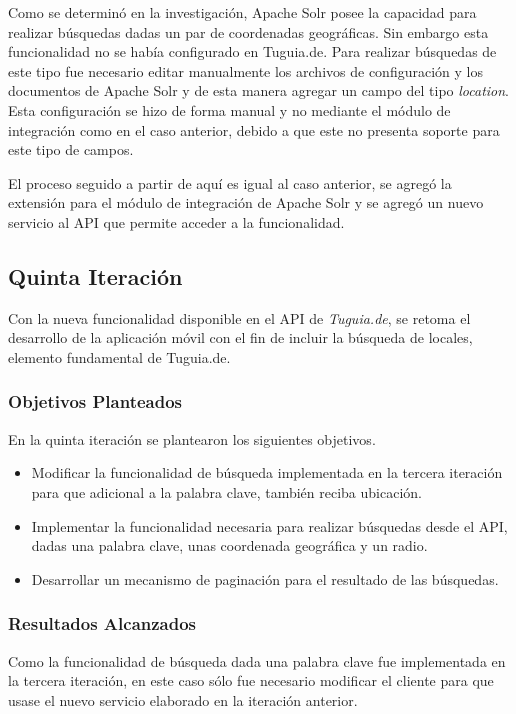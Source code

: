 Como se determinó en la investigación, Apache Solr posee la capacidad para realizar búsquedas dadas un par de coordenadas geográficas. Sin embargo esta funcionalidad no se había configurado en Tuguia.de. Para realizar búsquedas de este tipo fue necesario editar manualmente los archivos de configuración y los documentos de Apache Solr y de esta manera agregar un campo del tipo \textit{location}. Esta configuración se hizo de forma manual y no mediante el módulo de integración como en el caso anterior, debido a que este no presenta soporte para este tipo de campos. 

El proceso seguido a partir de aquí es igual al caso anterior, se agregó la extensión para el módulo de integración de Apache Solr y se agregó un nuevo servicio al API que permite acceder a la funcionalidad.

\subsection{Quinta Iteración}

Con la nueva funcionalidad disponible en el API de \textit{Tuguia.de}, se retoma el desarrollo de la aplicación móvil con el fin de incluir la búsqueda de locales, elemento fundamental de Tuguia.de.
 
\subsubsection{Objetivos Planteados} 
En la quinta iteración se plantearon los siguientes objetivos.
\begin{itemize}

\item Modificar la funcionalidad de búsqueda implementada en la tercera iteración para que adicional a la palabra clave, también reciba ubicación.
\item Implementar la funcionalidad necesaria para realizar búsquedas desde el API, dadas una palabra clave, unas coordenada geográfica y un radio.
\item Desarrollar un mecanismo de paginación para el resultado de las búsquedas.
\end{itemize}

\subsubsection{Resultados Alcanzados}

Como la funcionalidad de búsqueda dada una palabra clave fue implementada en la tercera iteración, en este caso sólo fue necesario modificar el cliente para que usase el nuevo servicio elaborado en la iteración anterior.

